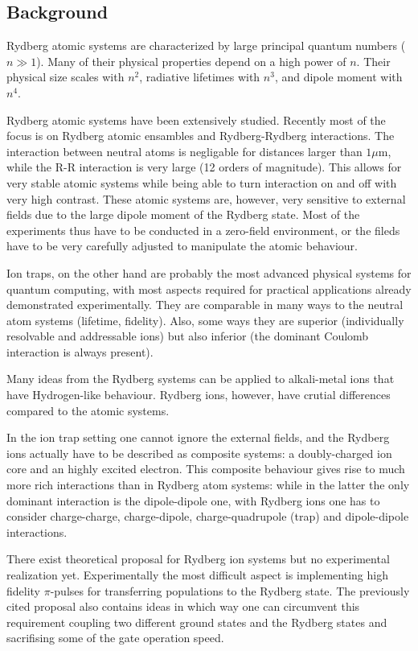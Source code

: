 \subsection{Background}

Rydberg atomic systems are characterized by large principal quantum numbers ($n \gg 1$). Many of their physical properties depend on a high power of $n$. Their physical size scales with $n^2$, radiative lifetimes with $n^3$, and dipole moment with $n^4$.

Rydberg atomic systems have been extensively studied. Recently most of the focus is on Rydberg atomic ensambles and Rydberg-Rydberg interactions. The interaction between neutral atoms is negligable for distances larger than $1 \mu {\mathrm m}$, while the R-R interaction is very large (12 orders of magnitude). This allows for very stable atomic systems while being able to turn interaction on and off with very high contrast. These atomic systems are, however, very sensitive to external fields due to the large dipole moment of the Rydberg state. Most of the experiments thus have to be conducted in a zero-field environment, or the fileds have to be very carefully adjusted to manipulate the atomic behaviour.

Ion traps, on the other hand are probably the most advanced physical systems for quantum computing, with most aspects required for practical applications already demonstrated experimentally. They are comparable in many ways to the neutral atom systems (lifetime, fidelity). Also, some ways they are superior (individually resolvable and addressable ions) but also inferior (the dominant Coulomb interaction is always present).

Many ideas from the Rydberg systems can be applied to alkali-metal ions that have Hydrogen-like behaviour. Rydberg ions, however, have crutial differences compared to the atomic systems.

In the ion trap setting one cannot ignore the external fields, and the Rydberg ions actually have to be described as composite systems: a doubly-charged ion core and an highly excited electron. This composite behaviour gives rise to much more rich interactions than in Rydberg atom systems: while in the latter the only dominant interaction is the dipole-dipole one, with Rydberg ions one has to consider charge-charge, charge-dipole, charge-quadrupole (trap) and dipole-dipole interactions.

There exist theoretical proposal for Rydberg ion systems \cite{Mueller2008} but no experimental realization yet. Experimentally the most difficult aspect is implementing high fidelity $\pi$-pulses for transferring populations to the Rydberg state. The previously cited proposal also contains ideas in which way one can circumvent this requirement coupling two different ground states and the Rydberg states and sacrifising some of the gate operation speed.





